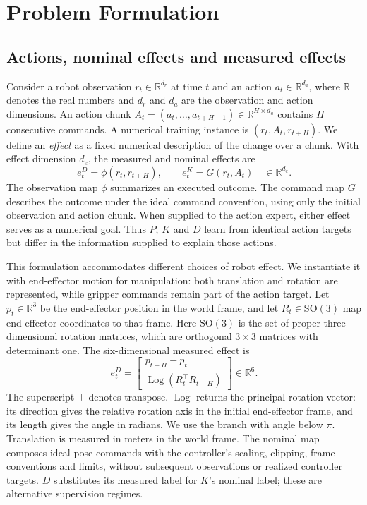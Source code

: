 \documentclass[conference]{IEEEtran}
\newcommand{\R}{\mathbb{R}}
\begin{document}
\section{Problem Formulation}
\subsection{Actions, nominal effects and measured effects}
Consider a robot observation $r_t\in\R^{d_r}$ at time $t$ and an action $a_t\in\R^{d_a}$, where $\R$ denotes the real numbers and $d_r$ and $d_a$ are the observation and action dimensions. An action chunk $A_t=(a_t,\ldots,a_{t+H-1})\in\R^{H\times d_a}$ contains $H$ consecutive commands. A numerical training instance is $(r_t,A_t,r_{t+H})$. We define an \emph{effect} as a fixed numerical description of the change over a chunk. With effect dimension $d_e$, the measured and nominal effects are
\begin{equation}
 e_t^D=\phi(r_t,r_{t+H}),\qquad e_t^K=G(r_t,A_t)
 \quad\in\R^{d_e}.
 \label{eq:effects_general}
\end{equation}
The observation map $\phi$ summarizes an executed outcome. The command map $G$ describes the outcome under the ideal command convention, using only the initial observation and action chunk. When supplied to the action expert, either effect serves as a numerical goal. Thus $P$, $K$ and $D$ learn from identical action targets but differ in the information supplied to explain those actions.

This formulation accommodates different choices of robot effect. We instantiate it with end-effector motion for manipulation: both translation and rotation are represented, while gripper commands remain part of the action target. Let $p_t\in\R^3$ be the end-effector position in the world frame, and let $R_t\in\mathrm{SO}(3)$ map end-effector coordinates to that frame. Here $\mathrm{SO}(3)$ is the set of proper three-dimensional rotation matrices, which are orthogonal $3\times3$ matrices with determinant one. The six-dimensional measured effect is
\begin{equation}
 e_t^D=\begin{bmatrix}
 p_{t+H}-p_t\\
 \operatorname{Log}(R_t^\top R_{t+H})
 \end{bmatrix}\in\R^6.
 \label{eq:effect}
\end{equation}
The superscript $\top$ denotes transpose. $\operatorname{Log}$ returns the principal rotation vector: its direction gives the relative rotation axis in the initial end-effector frame, and its length gives the angle in radians. We use the branch with angle below $\pi$. Translation is measured in meters in the world frame. The nominal map composes ideal pose commands with the controller's scaling, clipping, frame conventions and limits, without subsequent observations or realized controller targets. $D$ substitutes its measured label for $K$'s nominal label; these are alternative supervision regimes.
\end{document}
